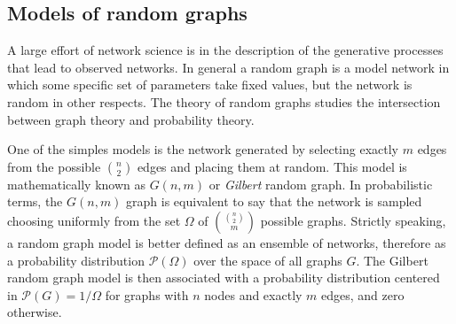 \subsection{Models of random graphs}\label{sec:models_random_graph}

A large effort of network science is in the description of the generative processes that lead to observed networks. In general a random graph is a model network in which some specific set of parameters take fixed values, but the network is random in other respects.
The theory of random graphs studies the intersection between graph theory and probability theory. %

One of the simples models is the network generated by selecting exactly $m$ edges from the possible $\binom{n}{2}$ edges and placing them at random. This model is mathematically known as $G(n,m)$ or \emph{Gilbert} random graph. In probabilistic terms, the $G(n,m)$ graph is equivalent to say that the network is sampled choosing uniformly from the set $\Omega$ of $\binom{\binom{n}{2}}{m}$ possible graphs. Strictly speaking, a random graph model is better defined as an ensemble of networks, therefore as a probability distribution $\mathcal{P}(\Omega)$ over the space of all graphs $G$. The Gilbert random graph model is then associated with a probability distribution centered in $\mathcal{P}(G)=1/\Omega$ for graphs with $n$ nodes and exactly $m$ edges, and zero otherwise.

